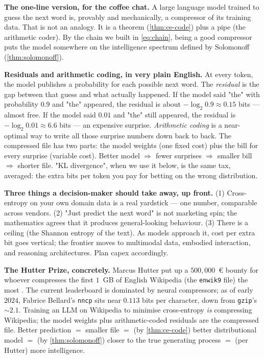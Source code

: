 \documentclass[12pt,a4paper]{article}
\theoremstyle{plain}
\theoremstyle{definition}
\begin{document}
\begin{intuition}
\textbf{The one-line version, for the coffee chat.}  A large language
model trained to guess the next word is, provably and mechanically,
a compressor of its training data.  That is not an analogy.  It is a
theorem (\cref{thm:ce-code}) plus a pipe (the arithmetic coder).
By the chain we built in \cref{eq:chain}, being a good compressor
puts the model somewhere on the intelligence spectrum defined by
Solomonoff (\cref{thm:solomonoff}).

\textbf{Residuals and arithmetic coding, in very plain English.}
At every token, the model publishes a probability for each possible
next word.  The \emph{residual} is the gap between that guess and
what actually happened.  If the model said "the" with probability
$0.9$ and "the" appeared, the residual is about $-\log_2 0.9 \approx
0.15$ bits --- almost free.  If the model said $0.01$ and "the" still
appeared, the residual is $-\log_2 0.01 \approx 6.6$ bits --- an
expensive surprise.  \emph{Arithmetic coding} is a near-optimal way
to write all those surprise numbers down back to back.  The
compressed file has two parts: the model weights (one fixed cost)
plus the bill for every surprise (variable cost).  Better model
$\Rightarrow$ fewer surprises $\Rightarrow$ smaller bill
$\Rightarrow$ shorter file.  "KL divergence", when we use it below,
is the same tax, averaged: the extra bits per token you pay for
betting on the wrong distribution.

\textbf{Three things a decision-maker should take away, up front.}
(1) Cross-entropy on your own domain data is a real yardstick ---
one number, comparable across vendors.  (2) "Just predict the next
word" is not marketing spin; the mathematics agrees that it produces
general-looking behaviour.  (3) There is a ceiling (the Shannon
entropy of the text).  As models approach it, cost per extra bit
goes vertical; the frontier moves to multimodal data, embodied
interaction, and reasoning architectures.  Plan capex accordingly.

\textbf{The Hutter Prize, concretely.}  Marcus Hutter put up a
$500{,}000$~\euro{} bounty for whoever compresses the first $1$~GB
of English Wikipedia (the \texttt{enwik9} file) the most
\citep{hutter2005universal}.  The current leaderboard is dominated
by neural compressors; as of early $2024$, Fabrice Bellard's
\texttt{nncp} sits near $0.113$ bits per character, down from
\texttt{gzip}'s $\sim 2.1$.  Training an LLM on Wikipedia to
minimise cross-entropy \emph{is} compressing Wikipedia; the model
weights plus arithmetic-coded residuals are the compressed file.
Better prediction $=$ smaller file $=$ (by \cref{thm:ce-code})
better distributional model $=$ (by \cref{thm:solomonoff}) closer
to the true generating process $=$ (per Hutter) more intelligence.


\end{intuition}
\end{document}
